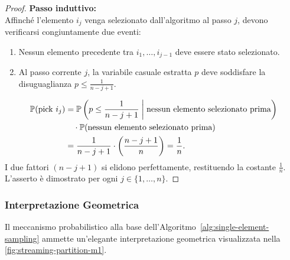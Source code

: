 \begin{proof}
\textbf{Passo induttivo:}\\
Affinché l'elemento $i_j$ venga selezionato dall'algoritmo al passo $j$, devono verificarsi congiuntamente due eventi:
\begin{enumerate}
  \item Nessun elemento precedente tra $i_1, \dots, i_{j-1}$ deve essere stato selezionato.
  \item Al passo corrente $j$, la variabile casuale estratta $p$ deve soddisfare la disuguaglianza $p \le \frac{1}{n - j + 1}$.
\end{enumerate}
\begin{align}
  \mathbb{P}(\text{pick } i_j) &= \mathbb{P}\left(p \le \frac{1}{n - j + 1} \;\middle|\; \text{nessun elemento selezionato prima}\right) \notag\\
  &\quad \cdot \mathbb{P}(\text{nessun elemento selezionato prima}) \notag\\
  &= \frac{1}{n - j + 1} \cdot \left(\frac{n - j + 1}{n}\right) = \frac{1}{n}.
\end{align}
I due fattori $(n - j + 1)$ si elidono perfettamente, restituendo la costante $\frac{1}{n}$. L'asserto è dimostrato per ogni $j \in \{1, \dots, n\}$.
\end{proof}

\subsubsection{Interpretazione Geometrica}
Il meccanismo probabilistico alla base dell'Algoritmo~\ref{alg:single-element-sampling} ammette un'elegante interpretazione geometrica visualizzata nella \autoref{fig:streaming-partition-m1}.

